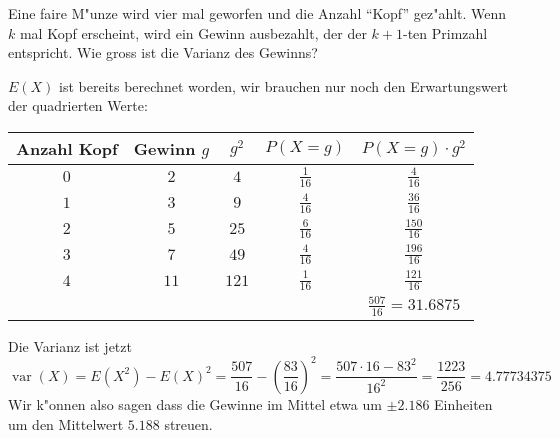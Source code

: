 Eine faire M"unze wird vier mal geworfen und die Anzahl ``Kopf'' gez"ahlt.
Wenn $k$ mal Kopf erscheint, wird ein Gewinn ausbezahlt, der der $k+1$-ten
Primzahl entspricht. Wie gross ist die Varianz des Gewinns?

\begin{loesung}
$E(X)$ ist bereits berechnet worden, wir brauchen nur noch den
Erwartungswert der quadrierten Werte:
\begin{center}
\begin{tabular}{|c|c|c|c|c|}
\hline
Anzahl Kopf&Gewinn $g$&$g^2$&$P(X=g)$&$P(X=g)\cdot g^2$\\
\hline
$0$&$ 2$&$  4$&$\frac1{16}$&$\frac{  4}{16}$\\
$1$&$ 3$&$  9$&$\frac4{16}$&$\frac{ 36}{16}$\\
$2$&$ 5$&$ 25$&$\frac6{16}$&$\frac{150}{16}$\\
$3$&$ 7$&$ 49$&$\frac4{16}$&$\frac{196}{16}$\\
$4$&$11$&$121$&$\frac1{16}$&$\frac{121}{16}$\\
\hline
&&&&$\frac{507}{16}=31.6875$\\
\hline
\end{tabular}
\end{center}
Die Varianz ist jetzt
\[
\operatorname{var}(X)
=E(X^2)-E(X)^2
=\frac{507}{16}-\left(\frac{83}{16}\right)^2
=\frac{507\cdot 16 - 83^2}{16^2}=\frac{1223}{256}=4.77734375
\]
Wir k"onnen also sagen dass die Gewinne im Mittel
etwa um $\pm2.186$ Einheiten um den Mittelwert $5.188$
streuen.
\end{loesung}

